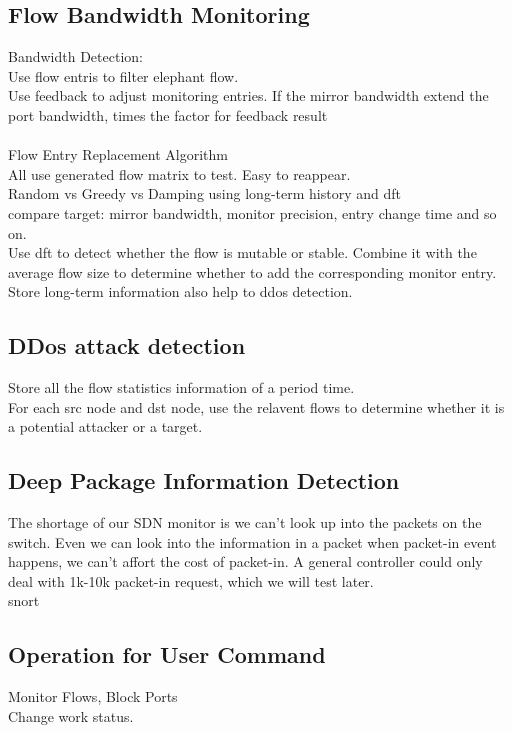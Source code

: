 \documentclass{acm_proc_article-sp}
\begin{document}
\subsection{Flow Bandwidth Monitoring}
Bandwidth Detection:\\
Use flow entris to filter elephant flow.\\
Use feedback to adjust monitoring entries. If the mirror bandwidth extend the port bandwidth, times the factor for feedback result\\
\\
Flow Entry Replacement Algorithm\\
All use generated flow matrix to test. Easy to reappear.\\
Random vs Greedy vs Damping using long-term history and dft\\
compare target: mirror bandwidth,  monitor precision, entry change time and so on.\\
Use dft to detect whether the flow is mutable or stable. Combine it with the average flow size to determine whether to add the corresponding monitor entry.\\
Store long-term information also help to ddos detection.\\

\subsection{DDos attack detection}
Store all the flow statistics information of a period time.\\
For each src node and dst node, use the relavent flows to determine whether it is a potential attacker or a target.

\subsection{Deep Package Information Detection}
The shortage of our SDN monitor is we can't look up into the packets on the switch. Even we can look into the information in a packet when packet-in event happens, we can't affort the cost of packet-in. A general controller could only deal with 1k-10k packet-in request, which we will test later.\\
snort

\subsection{Operation for User Command}
Monitor Flows, Block Ports\\
Change work status.\\
\end{document}
